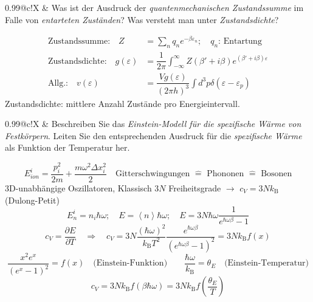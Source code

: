 \documentclass[a4paper,12pt]{scrartcl}
\makeatletter
\def\pf#1#2{\frac{\partial #1}{\partial #2}}		%
\def\ka#1{\left(#1\right)}				%
\def\kb#1{\left\langle #1\right\rangle}			%
\def\kB{k_\mathrm{B}}					%
\newcounter{qc}\setcounter{qc}{1}
\newenvironment{fshaded}{
\def\FrameCommand{\fcolorbox{framecolor}{shadecolor}}
\MakeFramed {\FrameRestore}}
{\endMakeFramed}
\def\frage#1{
\begin{fshaded}
\noindent
\begin{tabularx}{0.99\textwidth}{@{}c!{\color{framecolor}\vline}X}
{ \bf \rm \theqc }	&	\noindent #1
\end{tabularx}
\stepcounter{qc}
\end{fshaded}
}
\makeatother
\begin{document}
\frage{Was ist der Ausdruck der \textit{quantenmechanischen Zustandssumme} im Falle von \textit{entarteten Zuständen}? Was 
versteht man unter \textit{Zustandsdichte}?}
\noindent
\begin{align*}
\text{Zustandssumme:}\quad Z&=\sum_n q_n e^{-\beta \varepsilon_n}; \quad q_n \text{: Entartung}\\
\text{Zustandsdichte:}\quad g(\varepsilon)&=\dfrac{1}{2 \pi} \int_{-\infty}^{\infty} Z(\beta ' + i\beta)e^{(\beta ' + 
i\beta)\varepsilon}\\
\text{Allg.:}\quad  v(\varepsilon)&= \dfrac{V g(\varepsilon)}{(2 \pi h)^3} \int d^3\! p \delta(\varepsilon-\varepsilon_p)
\end{align*}
Zustandsdichte: mittlere Anzahl Zustände pro Energieintervall.



\frage{Beschreiben Sie das \textit{Einstein-Modell für die spezifische Wärme von Festkörpern}. Leiten Sie den entsprechenden 
Ausdruck für die \textit{spezifische Wärme} als Funktion der Temperatur her.}
\noindent
\[E_{ion}^i=\dfrac{p_i^2}{2m}+\dfrac{m\omega^2\Delta x_i^2}{2} \quad \text{Gitterschwingungen $\hat{=}$ Phononen $\hat{=}$ 
Bosonen} \]
3D-unabhängige Oszillatoren, Klassisch $3N$ Freiheitsgrade $\rightarrow$ $c_V=3N\kB $ (Dulong-Petit)\\
\[ E_n^i=n_i \hbar \omega; \quad E=\kb{n}\hbar \omega; \quad E=3N \hbar \omega \dfrac{1}{e^{\hbar \omega \beta}-1} \]
\[ c_V=\pf{E}{T} \quad \Rightarrow \quad  c_V=3N\dfrac{(\hbar \omega)^2}{\kB  T^2}\dfrac{e^{\hbar \omega 
\beta}}{\ka{e^{\hbar \omega \beta}-1}^2} =3N\kB f(x)\]
\[ \frac{x^2e^x}{\ka{e^x-1}^2}=f(x)\quad\text{(Einstein-Funktion)}\qquad\dfrac{\hbar \omega}{\kB }=\theta_E 
\quad\text{(Einstein-Temperatur)} \]
\[ c_V=3N\kB f(\beta\hbar\omega)=3N\kB f\ka{\frac{\theta_E}T}\]

\end{document}
